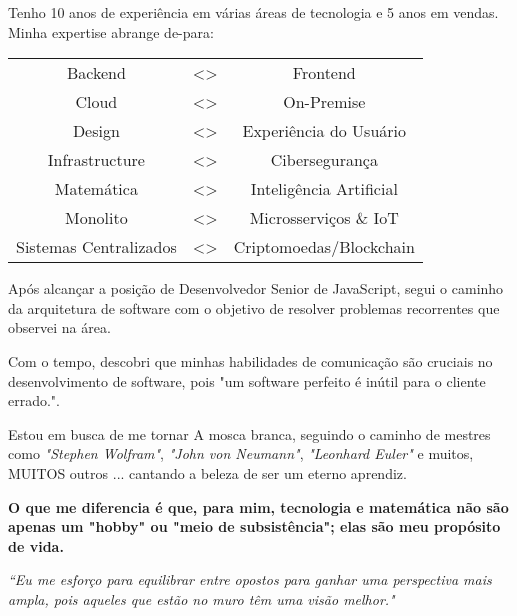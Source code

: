 

\begin{cvparagraph}

\vspace{2mm}

Tenho 10 anos de experiência em várias áreas de tecnologia e 5 anos em vendas. Minha expertise abrange de-para:\par
\begin{center}
	\begin{tabular}{c c c}
		Backend & \textless{}\textgreater{} & Frontend    \\
		Cloud   & \textless{}\textgreater{} & On-Premise  \\
		Design  & \textless{}\textgreater{} & Experiência do Usuário \\
		Infrastructure &  \textless{}\textgreater{} & Cibersegurança \\
		Matemática &  \textless{}\textgreater{} & Inteligência Artificial \\  
		Monolito &  \textless{}\textgreater{} & Microsserviços \& IoT \\    
		Sistemas Centralizados &  \textless{}\textgreater{} & Criptomoedas/Blockchain \\    
	\end{tabular}
\end{center}
Após alcançar a posição de Desenvolvedor Senior de JavaScript, segui o caminho da arquitetura de software com o objetivo de resolver problemas recorrentes que observei na área. \par
Com o tempo, descobri que minhas habilidades de comunicação são cruciais no desenvolvimento de software, pois "um software perfeito é inútil para o cliente errado.".\par
Estou em busca de me tornar A mosca branca, seguindo o caminho de mestres como \textit{"Stephen Wolfram"}, \textit{"John von Neumann"}, \textit{"Leonhard Euler"} e muitos, MUITOS outros ... cantando a beleza de ser um eterno aprendiz.\par
\textbf{O que me diferencia é que, para mim, tecnologia e matemática não são apenas um "hobby" ou "meio de subsistência"; elas são meu propósito de vida.}\par
\begin{flushright}
	\textit{``Eu me esforço para equilibrar entre opostos para ganhar uma perspectiva mais ampla, pois aqueles que estão no muro têm uma visão melhor."}
\end{flushright}


    
\end{cvparagraph}
